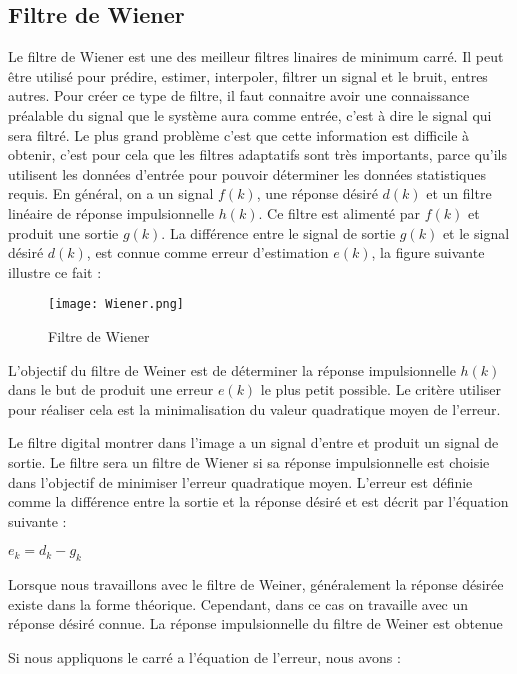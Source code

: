 \documentclass[conference,onecolumn]{IEEEtran}
\begin{document}
\subsection{\textbf{Filtre de Wiener}}
Le filtre de Wiener est une des meilleur filtres linaires de minimum carré. Il peut être utilisé pour prédire, estimer, interpoler, filtrer un signal et le bruit, entres autres. Pour créer ce type de filtre, il faut connaitre avoir une connaissance préalable du signal que le système aura comme entrée, c’est à dire le signal qui sera filtré. Le plus grand problème c’est que cette information est difficile à obtenir, c’est pour cela que les filtres adaptatifs sont très importants, parce qu’ils utilisent les données d’entrée pour pouvoir déterminer les données statistiques requis. En général, on a un signal $f(k)$, une réponse désiré $d(k)$ et un filtre linéaire de réponse impulsionnelle $h(k)$. Ce filtre est alimenté par $f(k)$ et produit une sortie $g(k)$. La différence entre le signal de sortie $g(k)$ et le signal désiré $d(k)$, est connue comme erreur d’estimation $e(k)$, la figure suivante illustre ce fait :


\begin{figure}[h]
 \centering
    \texttt{[image: Wiener.png]}
    \caption{Filtre de Wiener}
\end{figure}

L’objectif du filtre de Weiner est de déterminer la réponse impulsionnelle $h(k)$ dans le but de produit une erreur $e(k)$ le plus petit possible. Le critère utiliser pour réaliser cela est la minimalisation du valeur quadratique moyen de l’erreur.

Le filtre digital montrer dans l’image a un signal d’entre et produit un signal de sortie. Le filtre sera un filtre de Wiener si sa réponse impulsionnelle est choisie dans l’objectif de minimiser l’erreur quadratique moyen. L’erreur est définie comme la différence entre la sortie et la réponse désiré et est décrit par l’équation suivante :
\begin{center}
     $e_k=d_k-g_k$
\end{center}{}

Lorsque nous travaillons avec le filtre de Weiner, généralement la réponse désirée existe dans la forme théorique. Cependant, dans ce cas on travaille avec un réponse désiré connue. La réponse impulsionnelle du filtre de Weiner est obtenue 

Si nous appliquons le carré a l’équation de l’erreur, nous avons :
\end{document}
